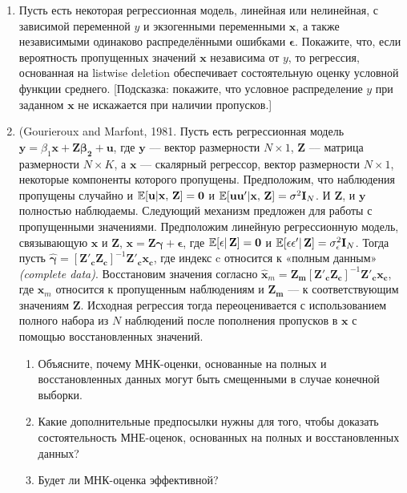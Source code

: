 \begin{enumerate}
\item Пусть есть некоторая регрессионная модель, линейная или нелинейная, с зависимой переменной $y$ и экзогенными переменными $\mathbf{x}$, а также независимыми одинаково распределёнными ошибками $\mathbf{\epsilon}$. Покажите, что, если вероятность пропущенных значений $\mathbf{x}$ независима от $y$, то регрессия, основанная на listwise deletion обеспечивает состоятельную оценку условной функции среднего. [Подсказка: покажите, что условное распределение $y$ при заданном $\mathbf{x}$ не искажается при наличии пропусков.]

\item (Gourieroux and Marfont, 1981. Пусть есть регрессионная модель $\mathbf{y}=\beta_1\mathbf{x}+\mathbf{Z\beta_2} + \mathbf{u}$, где $\mathbf{y}$ --– вектор размерности $N \times 1$, $\mathbf{Z}$ --– матрица размерности $N \times K$, а $\mathbf{x}$ --– скалярный регрессор, вектор размерности $N \times 1$, некоторые компоненты которого пропущены. Предположим, что наблюдения пропущены случайно и $\mathbb{E}[\mathbf{u}|\mathbf{x, \, Z}]=\mathbf{0}$ и $\mathbb{E}[\mathbf{uu'}|\mathbf{x, \, Z}]=\sigma^2\mathbf{I}_N$. И $\mathbf{Z}$, и $\mathbf{y}$ полностью наблюдаемы. Следующий механизм предложен для работы с пропущенными значениями. Предположим линейную регрессионную модель, связывающую $\mathbf{x}$ и $\mathbf{Z}$, $\mathbf{x}=\mathbf{Z\gamma}+ \mathbf{\epsilon}$, где $\mathbb{E}[\mathbf{\epsilon}| \, \mathbf{Z}]=\mathbf{0}$ и $\mathbb{E}[\mathbf{\epsilon \epsilon'}| \, \mathbf{Z}]=\sigma^2_{\epsilon}\mathbf{I}_N$. Тогда пусть $\widehat{\mathbf{\gamma}}=[\mathbf{Z'_c Z_c}]^{-1}\mathbf{Z'_c x_c}$, где индекс c относится к «полным данным» \emph{(complete data)}. Восстановим значения согласно $\widehat{\mathbf{x}}_m=\mathbf{Z_m}[\mathbf{Z'_c Z_c}]^{-1}\mathbf{Z'_c x_c}$, где $\mathbf{x}_m$ относится к пропущенным наблюдениям и $\mathbf{Z_m}$ –-- к соответствующим значениям $\mathbf{Z}$. Исходная регрессия тогда переоценивается с использованием полного набора из $N$ наблюдений после пополнения пропусков в $\mathbf{x}$ с помощью восстановленных значений.
\begin{enumerate}
\item	Объясните, почему МНК-оценки, основанные на полных и восстановленных данных могут быть смещенными в случае конечной выборки.
\item	Какие дополнительные предпосылки нужны для того, чтобы доказать состоятельность МНЕ-оценок, основанных на полных и восстановленных данных?
\item	Будет ли МНК-оценка эффективной?
\end{enumerate}


\end{enumerate}
